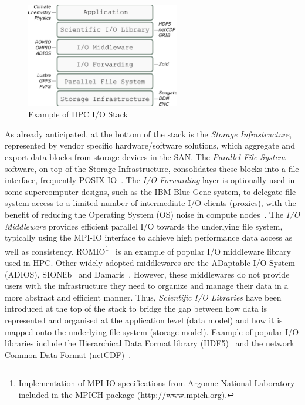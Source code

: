 \begin{figure}[!htb]
  \centering
  \includegraphics[width=0.6\textwidth]{chapters/figures/hpc-io-stack}
  \caption{Example of HPC I/O Stack}
  \label{figure: hpc-io-stack}
\end{figure}

As already anticipated, at the bottom of the stack is the \textit{Storage Infrastructure}, represented by vendor specific hardware/software solutions, which aggregate and export data blocks from storage devices in the SAN. 
The \textit{Parallel File System} software, on top of the Storage Infrastructure, consolidates these blocks into a file interface, frequently POSIX-IO~\cite{POSIX}. The \textit{I/O Forwarding} layer is optionally used 
in some supercomputer designs, such as the IBM Blue Gene system, to delegate file system access to a limited number of intermediate I/O clients (proxies), with the benefit of reducing the Operating System (OS) 
noise in compute nodes~\cite{AliCIKLLRWS09}. The \textit{I/O Middleware} provides efficient parallel I/O towards the underlying file system, typically using the MPI-IO interface to achieve high performance data access 
as well as consistency. ROMIO\footnote{Implementation of MPI-IO specifications from Argonne National Laboratory included in the MPICH package (\url{http://www.mpich.org}).}~\cite{ThakurGL99} is an example of popular I/O 
middleware library used in HPC. Other widely adopted middlewares are the ADaptable I/O System~\cite{CPE:CPE3125} (ADIOS), SIONlib~\cite{sionlib} and Damaris~\cite{DorierACSO12}. However, these middlewares do not provide 
users with the infrastructure they need to organize and manage their data in a more abstract and efficient manner. Thus, \textit{Scientific I/O Libraries} have been introduced at the top of the stack to bridge the 
gap between how data is represented and organised at the application level (data model) and how it is mapped onto the underlying file system (storage model). Example of popular I/O libraries include the Hierarchical Data 
Format library (HDF5)~\cite{carlosmalt:folk:sc99} and the network Common Data Format (netCDF)~\cite{1592942}.

